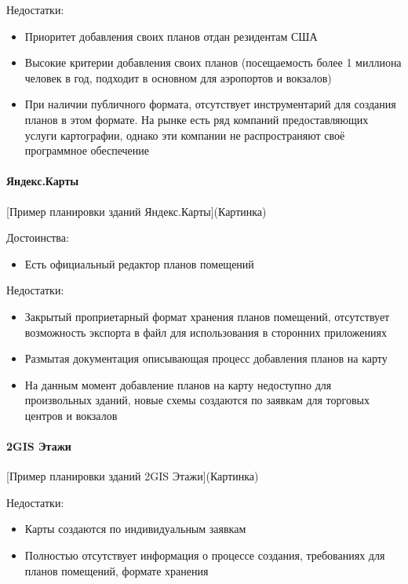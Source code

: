         \noindent Недостатки:
        \begin{itemize}
          \item Приоритет добавления своих планов отдан резидентам США
          \item Высокие критерии добавления своих планов (посещаемость более 1 миллиона человек в год, подходит в основном для аэропортов и вокзалов)
          \item При наличии публичного формата, отсутствует инструментарий для создания планов в этом формате. На рынке есть ряд компаний предоставляющих услуги картографии, однако эти компании не распространяют своё программное обеспечение
        \end{itemize}


      \paragraph{Яндекс.Карты}
        [Пример планировки зданий Яндекс.Карты](Картинка)

        \noindent Достоинства:
        \begin{itemize}
          \item Есть официальный редактор планов помещений
        \end{itemize}

        \noindent Недостатки:
        \begin{itemize}
          \item Закрытый проприетарный формат хранения планов помещений, отсутствует возможность экспорта в файл для использования в сторонних приложениях
          \item Размытая документация описывающая процесс добавления планов на карту
          \item На данным момент добавление планов на карту недоступно для произвольных зданий, новые схемы создаются по заявкам для торговых центров и вокзалов
        \end{itemize}


      \paragraph{2GIS Этажи}
        [Пример планировки зданий 2GIS Этажи](Картинка)

        \noindent Недостатки:
        \begin{itemize}
          \item Карты создаются по индивидуальным заявкам
          \item Полностью отсутствует информация о процессе создания, требованиях для планов помещений, формате хранения
        \end{itemize}

